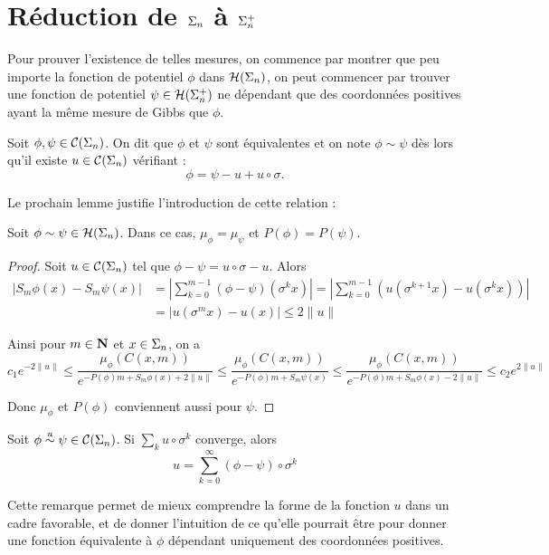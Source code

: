 \section{Réduction de $\s_n$ à $\sp_n$}

  Pour prouver l'existence de telles mesures, on commence par montrer que peu importe la fonction de potentiel $\phi$ dans $\Hs{n}$,
  on peut commencer par trouver une fonction de potentiel $\psi \in \Hsp{n}$
  ne dépendant que des coordonnées positives ayant la même mesure de Gibbs que $\phi$.

  \begin{definition}
    Soit $\phi, \psi \in \Cs{n}$. On dit que $\phi$ et $\psi$ sont équivalentes et on note $\phi \sim \psi$ dès lors
    qu'il existe $u \in \Cs{n}$ vérifiant :
    $$\phi = \psi - u + u \circ \sigma.$$
  \end{definition}

  Le prochain lemme justifie l'introduction de cette relation :

  \begin{lemma}
    Soit $\phi \sim \psi \in \Hs{n}$. Dans ce cas, $\mu_{\phi} = \mu_{\psi}$ et $P(\phi) = P(\psi)$.
  \end{lemma}

  \begin{proof}
    Soit $u \in \Cs{n}$ tel que $\phi - \psi = u\circ \sigma - u$. Alors
    \begin{align*}\left|S_m\phi(x) - S_m\psi(x)\right| &= \left|\sum_{k=0}^{m-1}(\phi - \psi)(\sigma^k x)\right|
							= \left|\sum_{k=0}^{m-1}(u(\sigma^{k+1}x) - u(\sigma^k x))\right| \\
						       &= \left|u(\sigma^m x) - u(x)\right| \leq 2 \lVert u \rVert
    \end{align*}

    Ainsi pour $m \in \N$ et $x \in \s_n$, on a
    $$c_1 e^{-2\lVert u\rVert} \leq \frac{\mu_{\phi}(C(x, m))}{e^{-P(\phi)m + S_m\phi(x) + 2\lVert u\rVert}}
			       \leq \frac{\mu_{\phi} (C(x, m))}{e^{-P(\phi)m + S_m\psi(x)}}
			       \leq \frac{\mu_{\phi}(C(x, m))}{e^{-P(\phi)m + S_m\phi(x) - 2\lVert u\rVert}} \leq c_2 e^{2\lVert u\rVert}$$

    Donc $\mu_{\phi}$ et $P(\phi)$ conviennent aussi pour $\psi$.
  \end{proof}

  \begin{remark}
    Soit $\phi \overset{u}{\sim} \psi \in \Cs{n}$. Si $\sum_k{u\circ\sigma^k}$ converge,
    alors
    $$u = \sum_{k=0}^{\infty}{(\phi - \psi) \circ \sigma^k}$$

    Cette remarque permet de mieux comprendre la forme de la fonction $u$ dans un cadre favorable,
    et de donner l'intuition de ce qu'elle pourrait être pour donner une fonction équivalente à $\phi$ dépendant uniquement des coordonnées positives.
  \end{remark}

